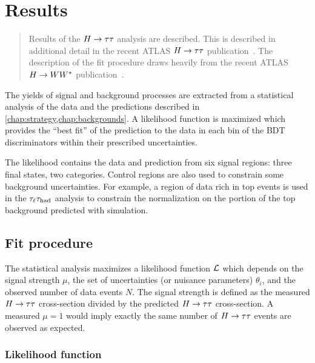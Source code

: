 \chapter[Results][Results]{Results}
\label{chap:results}

\begin{quote}
  Results of the $H\rightarrow\tau\tau$ analysis are described. This is described in additional detail in the recent ATLAS $H\rightarrow\tau\tau$ publication~\cite{HIGG-2013-32}. The description of the fit procedure draws heavily from the recent ATLAS $H\rightarrow WW^\ast$ publication~\cite{HIGG-2013-13}.
\end{quote}

The yields of signal and background processes are extracted from a statistical analysis of the data and the predictions described in \cref{chap:strategy,chap:backgrounds}. A likelihood function is maximized which provides the ``best fit'' of the prediction to the data in each bin of the BDT discriminators within their prescribed uncertainties.

The likelihood contains the data and prediction from six signal regions: three final states, two categories. Control regions are also used to constrain some background uncertainties. For example, a region of data rich in top events is used in the $\tau_\ell\tau_\text{had}$ analysis to constrain the normalization on the portion of the top background predicted with simulation.

\section{Fit procedure}
\label{sec:results-fit-procedure}

The statistical analysis maximizes a likelihood function $\mathcal{L}$ which depends on the signal strength $\mu$, the set of uncertainties (or nuisance parameters) $\theta_i$, and the observed number of data events $N$. The signal strength is defined as the measured $H\rightarrow\tau\tau$ cross-section divided by the predicted $H\rightarrow\tau\tau$ cross-section. A measured $\mu=1$ would imply exactly the same number of $H\rightarrow\tau\tau$ events are observed as expected.

\subsection{Likelihood function}

